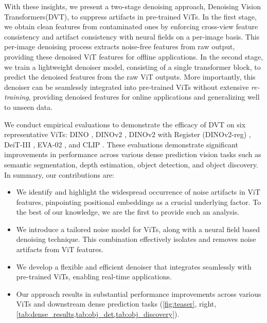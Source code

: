 \documentclass[runningheads]{llncs}
\newcommand{\ours}{DVT\xspace}
\newcommand{\ourslong}{Denoising Vision Transformers\xspace}
\begin{document}
With these insights, we present a two-stage denoising approach, \ourslong (\ours), to suppress artifacts in pre-trained ViTs. In the first stage, we obtain clean features from contaminated ones by enforcing cross-view feature consistency and artifact consistency with neural fields on a per-image basis. This per-image denoising process extracts noise-free features from raw output, providing these denoised ViT features for offline applications. In the second stage, we train a lightweight denoiser model, consisting of a single transformer block, to predict the denoised features from the raw ViT outputs. More importantly, this denoiser can be seamlessly integrated into pre-trained ViTs without extensive \textit{re-training}, providing denoised features for online applications and generalizing well to unseen data.




We conduct empirical evaluations to demonstrate the efficacy of \ours on six representative ViTs: DINO \cite{caron2021emerging}, DINOv2 \cite{oquab2023dinov2}, DINOv2 with Register (DINOv2-reg) \cite{darcet2023vision}, DeiT-III \cite{touvron2022deit}, EVA-02 \cite{fang2022eva,fang2023eva}, and CLIP \cite{radford2021learning}. These evaluations demonstrate significant improvements in performance across various dense prediction vision tasks such as semantic segmentation, depth estimation, object detection, and object discovery. In summary, our contributions are:
\begin{itemize}
    \item We identify and highlight the widespread occurrence of noise artifacts in ViT features, pinpointing positional embeddings as a crucial underlying factor. To the best of our knowledge, we are the first to provide such an analysis.
    \item We introduce a tailored noise model for ViTs, along with a neural field based denoising technique. This combination effectively isolates and removes noise artifacts from ViT features.
    \item We develop a flexible and efficient denoiser that integrates seamlessly with pre-trained ViTs, enabling real-time applications.
    \item Our approach results in substantial performance improvements across various ViTs and downstream dense prediction tasks (\cref{fig:teaser}, right, \cref{tab:dense_results,tab:obj_det,tab:obj_discovery}).
\end{itemize}
\end{document}
